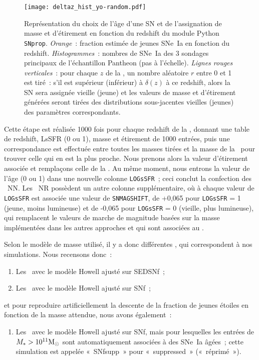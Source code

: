 \documentclass[../main/main.tex]{subfiles}
\begin{document}
\begin{figure}[]
    \centering
    \texttt{[image: deltaz\_hist\_yo-random.pdf]}
    \caption[Représentation du choix de l'âge d'une SN et de l'assignation de
    masse et d'étirement en fonction du redshift]{Représentation du choix de
        l'âge d'une SN et de l'assignation de masse et d'étirement en fonction
        du redshift du module Python \texttt{SNprop}.
        \textit{Orange}~: fraction estimée de jeunes SNe~Ia en fonction du
        redshift. \textit{Histogrammes}~: nombres de SNe~Ia des 3 sondages
        principaux de l'échantillon Pantheon \citep{scolnic2018} (pas à
        l'échelle). \textit{Lignes rouges verticales}~: pour chaque $z$ de la
        \hostlib, un nombre aléatoire $r$ entre 0 et 1 est tiré~: s'il est
        supérieur (inférieur) à $\delta(z)$ à ce redshift, alors la SN sera
        assignée vieille (jeune) et les valeurs de masse et d'étirement générées
        seront tirées des distributions sous-jacentes vieilles (jeunes) des
    paramètres correspondants.}
    \label{fig:deltaz}
\end{figure}

Cette étape est réalisée \num{1000} fois pour chaque redshift de la \hostlib,
donnant une table de redshift, LsSFR (0 ou 1), masse et étirement de \num{1000}
entrées, puis une correspondance est effectuée entre toutes les masses tirées et
la masse de la \hostlib\ pour trouver celle qui en est la plus proche. Nous
prenons alors la valeur d'étirement associée et remplaçons celle de la \hostlib.
Au même moment, nous entrons la valeur de l'âge (0 ou 1) dans une nouvelle
colonne \texttt{LOGsSFR}~; ceci conclut la confection des \hostlib\ NN. Les
\hostlib\ NR possèdent un autre colonne supplémentaire, où à chaque valeur de
\texttt{LOGsSFR} est associée une valeur de \texttt{SNMAGSHIFT}, de +0,065 pour
\texttt{LOGsSFR} = 1 (jeune, moins lumineuse) et de -0,065 pour \texttt{LOGsSFR}
= 0 (vieille, plus lumineuse), qui remplacent le valeurs de marche de magnitude
basées sur la masse implémentées dans les autres approches et qui sont associées
au \wgtmap.

Selon le modèle de masse utilisé, il y a donc différentes \hostlib, qui
correspondent à nos simulations. Nous recensons donc~:
\begin{enumerate}
    \item Les \hostlib\ avec le modèle Howell ajusté sur SEDSNf~;
    \item Les \hostlib\ avec le modèle Howell ajusté sur SNf~;
\end{enumerate}
et pour reproduire artificiellement la descente de la fraction de jeunes étoiles
en fonction de la masse attendue, nous avons également~:
\begin{enumerate}[resume]
    \item Les \hostlib\ avec le modèle Howell ajusté sur SNf, mais pour
        lesquelles les entrées de $M_* > 10^{11}\si{\Msun}$ sont automatiquement
        associées à des SNe~Ia âgées~; cette simulation est appelée «~SNfsupp~»
        pour «~suppressed~» («~réprimé~»).
\end{enumerate}
\end{document}
